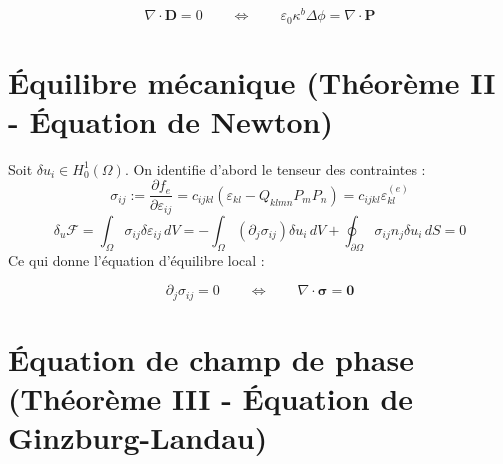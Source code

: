 \documentclass[11pt, a4paper]{article}
\begin{document}
\begin{tcolorbox}[title=Équation I — Loi de Gauss / Équation de Poisson]
\begin{equation}
\nabla\cdot\mathbf{D} = 0 \qquad\Longleftrightarrow\qquad \varepsilon_0\kappa^b\Delta\phi = \nabla\cdot\mathbf{P}
\end{equation}
\end{tcolorbox}

\section{Équilibre mécanique (Théorème II - Équation de Newton)}

Soit $\delta u_i \in H^1_0(\Omega)$. On identifie d'abord le tenseur des contraintes :
\begin{equation}
\sigma_{ij} := \frac{\partial f_e}{\partial \varepsilon_{ij}} = c_{ijkl}\left(\varepsilon_{kl} - Q_{klmn}P_mP_n\right) = c_{ijkl}\varepsilon^{(e)}_{kl}
\end{equation}
\begin{equation}
\delta_u\mathcal{F} = \int_\Omega \sigma_{ij}\delta\varepsilon_{ij} \, dV = -\int_\Omega (\partial_j\sigma_{ij})\delta u_i \, dV + \oint_{\partial\Omega}\sigma_{ij}n_j\delta u_i \, dS = 0
\end{equation}
Ce qui donne l'équation d'équilibre local :

\begin{tcolorbox}[title=Équation II — Équilibre mécanique de Lamé-Navier généralisé]
\begin{equation}
\partial_j\sigma_{ij} = 0 \qquad\Longleftrightarrow\qquad \nabla\cdot\boldsymbol{\sigma} = \mathbf{0}
\end{equation}
\end{tcolorbox}

\section{Équation de champ de phase (Théorème III - Équation de Ginzburg-Landau)}
\end{document}
